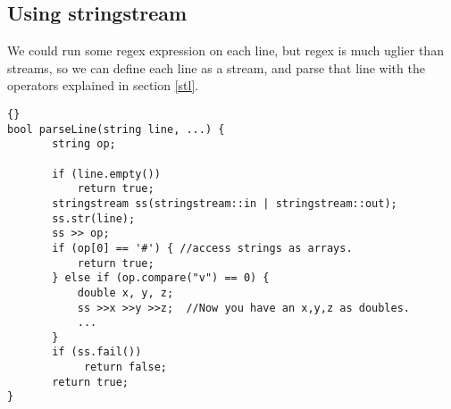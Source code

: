 \documentclass[]{article}
\begin{document}
\subsection{Using stringstream}

We could run some regex expression on each line, but regex is much uglier than streams, so we can define each line as a stream, and parse that line with the operators explained in section \ref{stl}.

\lstset{language=c++}
\lstset{commentstyle=\textit}
\begin{lstlisting}[frame=TRBL, caption=Using stringstream]{}
bool parseLine(string line, ...) {
       string op;

       if (line.empty())
           return true;
       stringstream ss(stringstream::in | stringstream::out);
       ss.str(line);
       ss >> op;
       if (op[0] == '#') { //access strings as arrays.
           return true;
       } else if (op.compare("v") == 0) {
           double x, y, z;
           ss >>x >>y >>z;  //Now you have an x,y,z as doubles.
           ...   
       }
       if (ss.fail())
            return false;
       return true;
}
\end{lstlisting}
\end{document}
